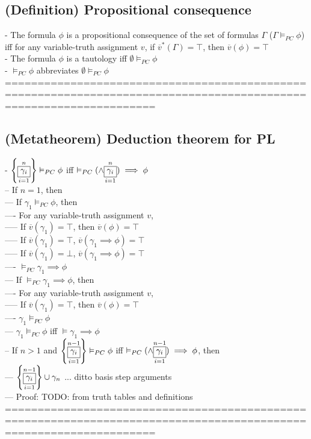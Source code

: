 \documentclass{book}
\newcommand{\extend}[1]{\overline{#1}}
\newcommand{\set}[1]{\left\{ #1 \right\}}
\newcommand{\vdc}[3]{\underset{#2}{\overset{#3}{\fbox{$#1$}}}}
\begin{document}
\subsection{(Definition) Propositional consequence} %
	- The formula $\phi$ is a propositional consequence of the set of formulas $\Gamma$ ($\Gamma \vDash_{PC} \phi$) iff for any variable-truth assignment $v$, if $\extend{v}^*(\Gamma) = \top$, then $\extend{v}(\phi) = \top$ \\
	- The formula $\phi$ is a tautology iff $\emptyset \vDash_{PC} \phi$ \\
	- $\vDash_{PC} \phi$ abbreviates $\emptyset \vDash_{PC} \phi$ \\
	===================================================================================================================
\subsection{(Metatheorem) Deduction theorem for PL} %
	- $\set{\vdc{\gamma_i}{i=1}{n}} \vDash_{PC} \phi$ iff $\vDash_{PC} (\land \vdc{\gamma_i}{i=1}{n}) \implies \phi$ \\
		-- If $n = 1$, then \\
			--- If $\gamma_1 \vDash_{PC} \phi$, then \\
				---- For any variable-truth assignment $v$, \\
					----- If $\extend{v}(\gamma_1) = \top$, then $\extend{v}(\phi) = \top$ \\
					----- If $\extend{v}(\gamma_1) = \top$, $\extend{v}(\gamma_1 \implies \phi) = \top$ \\
					----- If $\extend{v}(\gamma_1) = \bot$, $\extend{v}(\gamma_1 \implies \phi) = \top$ \\
				---- $\vDash_{PC} \gamma_1 \implies \phi$ \\
			--- If $\vDash_{PC} \gamma_1 \implies \phi$, then \\
				---- For any variable-truth assignment $v$, \\
					----- If $\extend{v}(\gamma_1) = \top$, then $\extend{v}(\phi) = \top$ \\
				---- $\gamma_1 \vDash_{PC} \phi$ \\
			--- $\gamma_1 \vDash_{PC} \phi$ iff $\vDash \gamma_1 \implies \phi$ \\
		-- If $n > 1$ and $\set{\vdc{\gamma_i}{i=1}{n-1}} \vDash_{PC} \phi$ iff $\vDash_{PC} (\land \vdc{\gamma_i}{i=1}{n-1}) \implies \phi$, then \\
			--- $\set{\vdc{\gamma_i}{i=1}{n-1}} \cup \gamma_n$ ... ditto basis step arguments \\
			--- Proof: TODO: from truth tables and definitions \\
	===================================================================================================================
\end{document}
